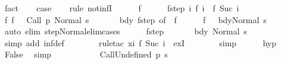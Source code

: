 \begin{isabellebody}
\ fact\isanewline
\ \ \isamarkupfalse%
\ {\isacharquery}case\isanewline
\ \ \isamarkupfalse%
\ {\isacharparenleft}rule\ not{\isacharunderscore}infI{\isacharparenright}\isanewline
\ \ \ \ \isamarkupfalse%
\ f\isanewline
\ \ \ \ \isamarkupfalse%
\ f{\isacharunderscore}step{\isacharcolon}\ {\isachardoublequoteopen}{\isasymAnd}i{\isachardot}\ {\isasymGamma}{\isasymturnstile}f\ i\ {\isasymrightarrow}\ f\ {\isacharparenleft}Suc\ i{\isacharparenright}{\isachardoublequoteclose}\isanewline
\ \ \ \ \isamarkupfalse%
\ f{\isacharunderscore}{}{\isacharcolon}\ {\isachardoublequoteopen}f\ {}\ {\isacharequal}\ {\isacharparenleft}Call\ p{\isacharcomma}\ Normal\ s{\isacharparenright}{\isachardoublequoteclose}\ \isanewline
\ \ \ \ \isamarkupfalse%
\ bdy\ f{\isacharunderscore}step\ {\isacharbrackleft}of\ {}{\isacharbrackright}\ f{\isacharunderscore}{}\isanewline
\ \ \ \ \isamarkupfalse%
\ {\isachardoublequoteopen}f\ {}\ {\isacharequal}\ {\isacharparenleft}bdy{\isacharcomma}Normal\ s{\isacharparenright}{\isachardoublequoteclose}\isanewline
\ \ \ \ \ \ \isamarkupfalse%
\ {\isacharparenleft}auto\ elim{\isacharcolon}\ step{\isacharunderscore}Normal{\isacharunderscore}elim{\isacharunderscore}cases{\isacharparenright}\isanewline
\ \ \ \ \isamarkupfalse%
\ f{\isacharunderscore}step\isanewline
\ \ \ \ \isamarkupfalse%
\ {\isachardoublequoteopen}{\isasymGamma}{\isasymturnstile}\ {\isacharparenleft}bdy{\isacharcomma}\ Normal\ s{\isacharparenright}\ {\isasymrightarrow}\ {\isasymdots}{\isacharparenleft}{\isasyminfinity}{\isacharparenright}{\isachardoublequoteclose}\isanewline
\ \ \ \ \ \ \isamarkupfalse%
\ {\isacharparenleft}simp\ add{\isacharcolon}\ inf{\isacharunderscore}def{\isacharparenright}\isanewline
\ \ \ \ \ \ \isamarkupfalse%
\ {\isacharparenleft}rule{\isacharunderscore}tac\ x{\isacharequal}{\isachardoublequoteopen}{\isasymlambda}i{\isachardot}\ f\ {\isacharparenleft}Suc\ i{\isacharparenright}{\isachardoublequoteclose}\ \ exI{\isacharparenright}\isanewline
\ \ \ \ \ \ \isamarkupfalse%
\ simp\isanewline
\ \ \ \ \isamarkupfalse%
\ hyp\ \isamarkupfalse%
\ False\ \isamarkupfalse%
\ simp\isanewline
\ \ \isamarkupfalse%
\ \ \ \ \isanewline
{}\isamarkupfalse%
\isanewline
\ \ \isamarkupfalse%
\ {\isacharparenleft}CallUndefined\ p\ s{\isacharparenright}\isanewline

\end{isabellebody}
